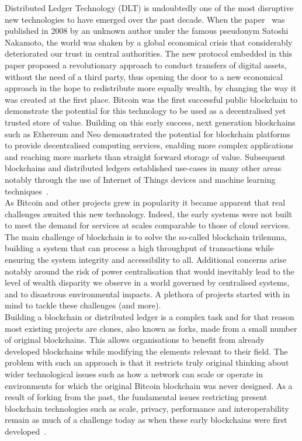 Distributed Ledger Technology (DLT) is undoubtedly one of the most disruptive new  technologies to have emerged over the past decade. When the paper~\cite{nakamoto} was published in 2008 by an unknown author under the famous pseudonym Satoshi Nakamoto, the world was shaken by a global economical crisis that considerably deteriorated our trust in central authorities. The new protocol embedded in this paper proposed a revolutionary approach to conduct transfers of digital assets, without the need of a third party, thus opening the door to a new economical approach in the hope to redistribute more equally wealth, by changing the way it was created at the first place. Bitcoin was the first successful public blockchain to demonstrate the potential for this technology to be used as a decentralised yet trusted store of value. Building on this early success, next generation blockchains such as Ethereum and Neo demonstrated the potential for blockchain platforms to provide decentralised computing services, enabling more complex applications and reaching more markets than straight forward storage of value. Subsequent blockchains and distributed ledgers established use-cases in many other areas notably through the use of Internet of Things devices and machine learning techniques~\cite{govuk}.\\

As Bitcoin and other projects grew in popularity it became apparent that real challenges awaited this new technology. Indeed, the early systems were not built to meet the demand for services at scales comparable to those of cloud services. The main challenge of blockchain is to solve the so-called blockchain trilemma, building a system that can process a high throughput of transactions while ensuring the system integrity and accessibility to all. Additional concerns arise notably around the risk of power centralisation that would inevitably lead to the level of wealth disparity we observe in a world governed by centralised systems, and to disastrous environmental impacts. A plethora of projects started with in mind to tackle these challenges (and more).\\

Building a blockchain or distributed ledger is a complex task and for that reason most existing projects are clones, also known as forks, made from a small number of original blockchains. This allows organisations to benefit from already developed blockchains while modifying the elements relevant to their field. The problem with such an approach is that it restricts truly original thinking about wider technological issues such as how a network can scale or operate in environments for which the original Bitcoin blockchain was never designed. As a result of forking from the past, the fundamental issues restricting present blockchain technologies such as scale, privacy, performance and interoperability remain as much of a challenge today as when these early blockchains were first developed~\cite{obst}.\\

